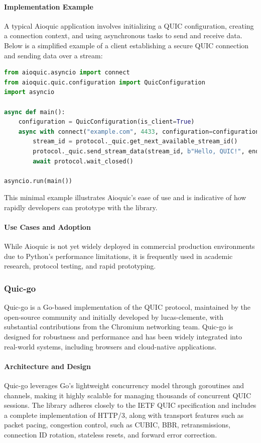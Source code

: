 \paragraph{Implementation Example}
A typical Aioquic application involves initializing a QUIC configuration, creating a connection context, and using asynchronous tasks to send and receive data. Below is a simplified example of a client establishing a secure QUIC connection and sending data over a stream:

\begin{lstlisting}[language=python]
from aioquic.asyncio import connect
from aioquic.quic.configuration import QuicConfiguration
import asyncio

async def main():
    configuration = QuicConfiguration(is_client=True)
    async with connect("example.com", 4433, configuration=configuration) as protocol:
        stream_id = protocol._quic.get_next_available_stream_id()
        protocol._quic.send_stream_data(stream_id, b"Hello, QUIC!", end_stream=True)
        await protocol.wait_closed()

asyncio.run(main())
\end{lstlisting}

This minimal example illustrates Aioquic's ease of use and is indicative of how rapidly developers can prototype with the library.

\paragraph{Use Cases and Adoption}
While Aioquic is not yet widely deployed in commercial production environments due to Python's performance limitations, it is frequently used in academic research, protocol testing, and rapid prototyping.

\subsubsection{Quic-go}
Quic-go is a Go-based implementation of the QUIC protocol, maintained by the open-source community and initially developed by lucas-clemente, with substantial contributions from the Chromium networking team. Quic-go is designed for robustness and performance and has been widely integrated into real-world systems, including browsers and cloud-native applications.

\paragraph{Architecture and Design}
Quic-go leverages Go's lightweight concurrency model through goroutines and channels, making it highly scalable for managing thousands of concurrent QUIC sessions. The library adheres closely to the IETF QUIC specification and includes a complete implementation of HTTP/3, along with transport features such as packet pacing, congestion control, such as CUBIC, BBR, retransmissions, connection ID rotation, stateless resets, and forward error correction.

